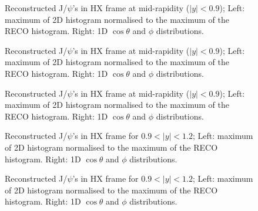\documentclass[12pt]{article}
\newcommand{\jpsi}{J/$\psi$}
\begin{document}
\begin{figure}[htbp]
\centering
{}
\caption{Reconstructed \jpsi's in HX frame at mid-rapidity ($|y| < 0.9$); Left: maximum of 2D histogram normalised to the maximum of the RECO histogram. Right: 1D $\cos\theta$ and $\phi$ distributions.}
\label{fig:trackerMuonsVsEta}
\end{figure} \clearpage

\begin{figure}[htbp]
\centering
{}
\caption{Reconstructed \jpsi's in HX frame at mid-rapidity ($|y| < 0.9$); Left: maximum of 2D histogram normalised to the maximum of the RECO histogram. Right: 1D $\cos\theta$ and $\phi$ distributions.}
\label{fig:trackerMuonsVsEta}
\end{figure} \clearpage 

\begin{figure}[htbp]
\centering
{}
\caption{Reconstructed \jpsi's in HX frame at mid-rapidity ($|y| < 0.9$); Left: maximum of 2D histogram normalised to the maximum of the RECO histogram. Right: 1D $\cos\theta$ and $\phi$ distributions.}
\label{fig:trackerMuonsVsEta}
\end{figure} \clearpage 

\begin{figure}[htbp]
\centering
{}
\caption{Reconstructed \jpsi's in HX frame for $0.9 < |y| < 1.2$; Left: maximum of 2D histogram normalised to the maximum of the RECO histogram. Right: 1D $\cos\theta$ and $\phi$ distributions.}
\label{fig:trackerMuonsVsEta}
\end{figure} \clearpage 

\begin{figure}[htbp]
\centering
{}
\caption{Reconstructed \jpsi's in HX frame for $0.9 < |y| < 1.2$; Left: maximum of 2D histogram normalised to the maximum of the RECO histogram. Right: 1D $\cos\theta$ and $\phi$ distributions.}
\label{fig:trackerMuonsVsEta}
\end{figure} \clearpage 
\end{document}
